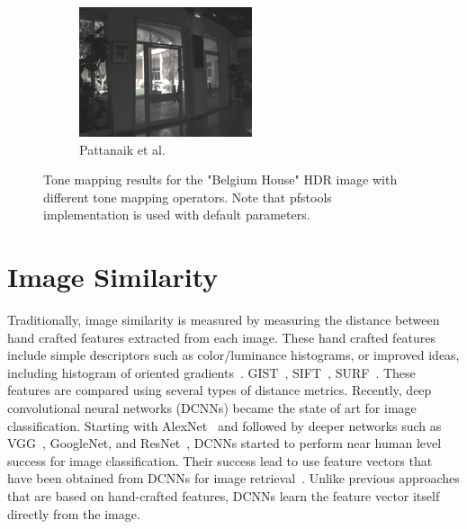 \begin{figure}
\begin{subfigure}[b]{0.33\textwidth}
    \includegraphics[width=\textwidth]{figures/chapter2/tmos44/44_pattanaik00.png}
    \caption{Pattanaik et al.~\cite{pattanaik2000time}}
\end{subfigure}\hfill
\caption{Tone mapping results for the "Belgium House" HDR image with different tone mapping operators. Note that pfstools~\cite{HDRGallery} implementation is used with default parameters.}
\label{fig:tmos}
\end{figure}

\section{Image Similarity}

Traditionally, image similarity is measured by measuring the distance between hand crafted features extracted from each image. These hand crafted features include simple descriptors such as color/luminance histograms, or improved ideas, including histogram of oriented gradients~\cite{dalal2005histograms}. GIST~\cite{oliva2001modeling}, SIFT~\cite{lowe2004distinctive}, SURF~\cite{bay2006surf}. These features are compared using several types of distance metrics. Recently, deep convolutional neural networks (DCNNs) became the state of art for image classification. Starting with AlexNet~\cite{krizhevsky2012imagenet} and followed by deeper networks such as VGG~\cite{simonyan2014very}, GoogleNet\cite{szegedy2015going}, and ResNet~\cite{he2016deep}, DCNNs started to perform near human level success for image classification. Their success lead to use feature vectors that have been obtained from DCNNs for image retrieval~\cite{wan2014deep,gordo2016deep,noh2017large,radenovic2018fine}. Unlike previous approaches that are based on hand-crafted features, DCNNs learn the feature vector itself directly from the image. 

